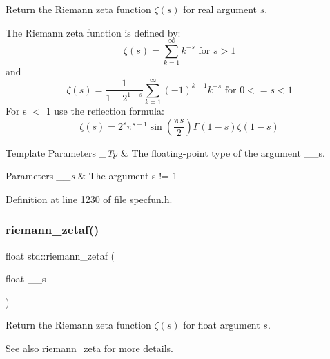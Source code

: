Return the Riemann zeta function $ \zeta(s) $ for real argument $ s $.

The Riemann zeta function is defined by\+: \[ \zeta(s) = \sum_{k=1}^{\infty} k^{-s} \mbox{ for } s > 1 \] and \[ \zeta(s) = \frac{1}{1-2^{1-s}}\sum_{k=1}^{\infty}(-1)^{k-1}k^{-s} \mbox{ for } 0 <= s < 1 \] For s $<$ 1 use the reflection formula\+: \[ \zeta(s) = 2^s \pi^{s-1} \sin(\frac{\pi s}{2}) \Gamma(1-s) \zeta(1-s) \]


\begin{DoxyTemplParams}{Template Parameters}
{\em \+\_\+\+Tp} & The floating-\/point type of the argument {\ttfamily \+\_\+\+\_\+s}. \\
\hline
\end{DoxyTemplParams}

\begin{DoxyParams}{Parameters}
{\em \+\_\+\+\_\+s} & The argument {\ttfamily  s != 1 } \\
\hline
\end{DoxyParams}


Definition at line 1230 of file specfun.\+h.

\mbox{\label{group__tr29124__math__spec__func_gaf92063315061a56d3e2c4053156d968e}} 
\subsubsection{\texorpdfstring{riemann\+\_\+zetaf()}{riemann\_zetaf()}}
{\footnotesize\ttfamily float std\+::riemann\+\_\+zetaf (\begin{DoxyParamCaption}\item[{float}]{\+\_\+\+\_\+s }\end{DoxyParamCaption})\hspace{0.3cm}{\ttfamily [inline]}}

Return the Riemann zeta function $ \zeta(s) $ for {\ttfamily float} argument $ s $.

\begin{DoxySeeAlso}{See also}
\hyperlink{group__tr29124__math__spec__func_gac4ef9d52ee583c77937c3a420b7c72ca}{riemann\+\_\+zeta} for more details. 
\end{DoxySeeAlso}


